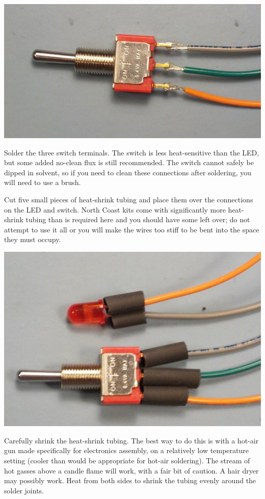 \noindent\includegraphics[width=\linewidth]{switch-mechanical.jpg}

Solder the three switch terminals.  The switch is less heat-sensitive than
the LED, but some added no-clean flux is still recommended.  The switch
cannot safely be dipped in solvent, so if you need to clean these
connections after soldering, you will need to use a brush.

Cut five small pieces of heat-shrink tubing and place them over the
connections on the LED and switch.  North Coast kits come with significantly
more heat-shrink tubing than is required here and you should have some left
over; do not attempt to use it all or you will make the wires too stiff to
be bent into the space they must occupy.

\noindent\includegraphics[width=\linewidth]{heat-shrink.jpg}

Carefully shrink the heat-shrink tubing.  The best way to do this is with a
hot-air gun made specifically for electronics assembly, on a relatively low
temperature setting (cooler than would be appropriate for hot-air
soldering).  The stream of hot gasses above a candle flame will work, with a
fair bit of caution.  A hair dryer may possibly work.  Heat from both sides
to shrink the tubing evenly around the solder joints.

